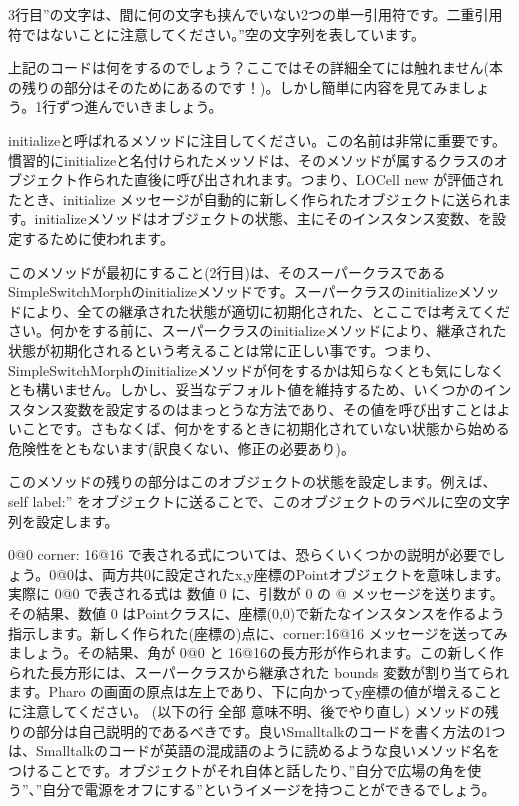 \documentclass[a4paper,10pt,twoside]{book}
\begin{document}
\noindent
3行目''の文字は、間に何の文字も挟んでいない2つの単一引用符です。二重引用符ではないことに注意してください。''空の文字列を表しています。


上記のコードは何をするのでしょう？ここではその詳細全てには触れません(本の残りの部分はそのためにあるのです！)。しかし簡単に内容を見てみましょう。1行ずつ進んでいきましょう。

initializeと呼ばれるメソッドに注目してください。この名前は非常に重要です。慣習的にinitializeと名付けられたメッソドは、そのメソッドが属するクラスのオブジェクト作られた直後に呼び出されれます。つまり、LOCell new が評価されたとき、initialize メッセージが自動的に新しく作られたオブジェクトに送られます。initializeメソッドはオブジェクトの状態、主にそのインスタンス変数、を設定するために使われます。

このメソッドが最初にすること(2行目)は、そのスーパークラスであるSimpleSwitchMorphのinitializeメソッドです。スーパークラスのinitializeメソッドにより、全ての継承された状態が適切に初期化された、とここでは考えてください。何かをする前に、スーパークラスのinitializeメソッドにより、継承された状態が初期化されるという考えることは常に正しい事です。つまり、SimpleSwitchMorphのinitializeメソッドが何をするかは知らなくとも気にしなくとも構いません。しかし、妥当なデフォルト値を維持するため、いくつかのインスタンス変数を設定するのはまっとうな方法であり、その値を呼び出すことはよいことです。さもなくば、何かをするときに初期化されていない状態から始める危険性をともないます(訳良くない、修正の必要あり)。

このメソッドの残りの部分はこのオブジェクトの状態を設定します。例えば、self label:'' をオブジェクトに送ることで、このオブジェクトのラベルに空の文字列を設定します。

0@0 corner: 16@16 で表される式については、恐らくいくつかの説明が必要でしょう。0@0は、両方共0に設定されたx,y座標のPointオブジェクトを意味します。実際に 0@0 で表される式は 数値 0 に、引数が 0 の @ メッセージを送ります。その結果、数値 0 はPointクラスに、座標(0,0)で新たなインスタンスを作るよう指示します。新しく作られた(座標の)点に、corner:16@16 メッセージを送ってみましょう。その結果、角が 0@0 と 16@16の長方形が作られます。この新しく作られた長方形には、スーパークラスから継承された bounds 変数が割り当てられます。Pharo の画面の原点は左上であり、下に向かってy座標の値が増えることに注意してください。
(以下の行 全部 意味不明、後でやり直し)
メソッドの残りの部分は自己説明的であるべきです。良いSmalltalkのコードを書く方法の1つは、Smalltalkのコードが英語の混成語のように読めるような良いメソッド名をつけることです。オブジェクトがそれ自体と話したり、”自分で広場の角を使う”、”自分で電源をオフにする”というイメージを持つことができるでしょう。
\end{document}
